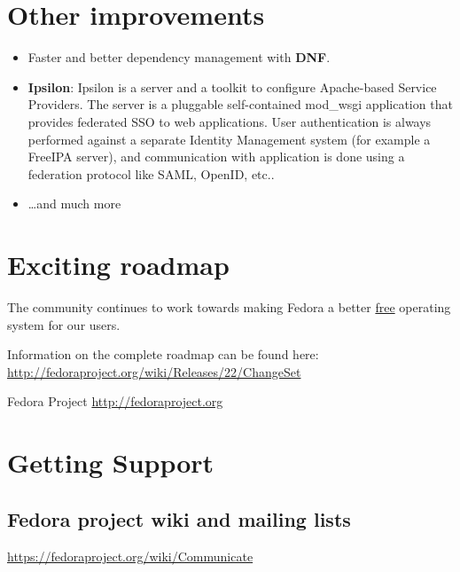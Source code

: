 \documentclass[
notumble,
letterpaper,
10pt
]{leaflet}
\begin{document}
\section{\textcolor{FedoraBlue}{Other improvements}}
\begin{itemize}
  \item Faster and better dependency management with \textbf{DNF}.
  \item \textbf{Ipsilon}: Ipsilon is a server and a toolkit to configure Apache-based Service Providers. The server is a pluggable self-contained mod\_wsgi application that provides federated SSO to web applications. User authentication is always performed against a separate Identity Management system (for example a FreeIPA server), and communication with application is done using a federation protocol like SAML, OpenID, etc.. 
  \item \ldots and much more
\end{itemize}

\section{\textcolor{FedoraBlue}{Exciting roadmap}}
The community continues to work towards making Fedora a better \href{http://www.gnu.org/philosophy/free-sw.en.html}{free} operating system for our users.

Information on the complete roadmap can be found here:\\ \href{http://fedoraproject.org/wiki/Releases/22/ChangeSet}{http://fedoraproject.org/wiki/Releases/22/ChangeSet}

\newpage

\begin{center}
  {\color{FedoraBlue}
  \LARGE{Fedora Project\vspace{1cm}}
  \Large{\href{http://fedoraproject.org}{http://fedoraproject.org}}
}
\end{center}

\section{\textcolor{FedoraBlue}{Getting Support}}
\subsection{Fedora project wiki and mailing lists}
\href{https://fedoraproject.org/wiki/Communicate}{https://fedoraproject.org/wiki/Communicate}
\end{document}
